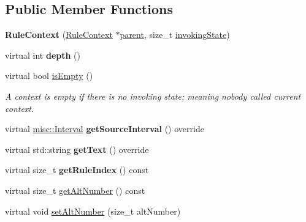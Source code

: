 \subsection*{Public Member Functions}
\begin{DoxyCompactItemize}
\item 
\mbox{\label{classantlr4_1_1RuleContext_a3a8366fbdf9e4782e0770cafe361ef4d}} 
{\bfseries Rule\+Context} (\hyperlink{classantlr4_1_1RuleContext}{Rule\+Context} $\ast$\hyperlink{classantlr4_1_1tree_1_1ParseTree_a83402632670316b68280c04e6be70d50}{parent}, size\+\_\+t \hyperlink{classantlr4_1_1RuleContext_a2c4b8b84636c681f98dcd86d5c5a8459}{invoking\+State})
\item 
\mbox{\label{classantlr4_1_1RuleContext_a84b5f07f832e628025b22bd1554c239c}} 
virtual int {\bfseries depth} ()
\item 
\mbox{\label{classantlr4_1_1RuleContext_a9b85b3df53a724a0a3cc2b8bc949045e}} 
virtual bool \hyperlink{classantlr4_1_1RuleContext_a9b85b3df53a724a0a3cc2b8bc949045e}{is\+Empty} ()
\begin{DoxyCompactList}\small\item\em A context is empty if there is no invoking state; meaning nobody called current context. \end{DoxyCompactList}\item 
\mbox{\label{classantlr4_1_1RuleContext_a7d1c4ec653dabbe03cec49275c9a5915}} 
virtual \hyperlink{classantlr4_1_1misc_1_1Interval}{misc\+::\+Interval} {\bfseries get\+Source\+Interval} () override
\item 
\mbox{\label{classantlr4_1_1RuleContext_a33302ceb47c02e06e24beffac9b8564e}} 
virtual std\+::string {\bfseries get\+Text} () override
\item 
\mbox{\label{classantlr4_1_1RuleContext_ab3c47d330254d4224073408522ac6956}} 
virtual size\+\_\+t {\bfseries get\+Rule\+Index} () const
\item 
virtual size\+\_\+t \hyperlink{classantlr4_1_1RuleContext_abb31efff7ed16c524298b9052c75e8f7}{get\+Alt\+Number} () const
\item 
virtual void \hyperlink{classantlr4_1_1RuleContext_a13942e9b3fc17ab566e92e6c8c2d88e2}{set\+Alt\+Number} (size\+\_\+t alt\+Number)

\end{DoxyCompactItemize}
